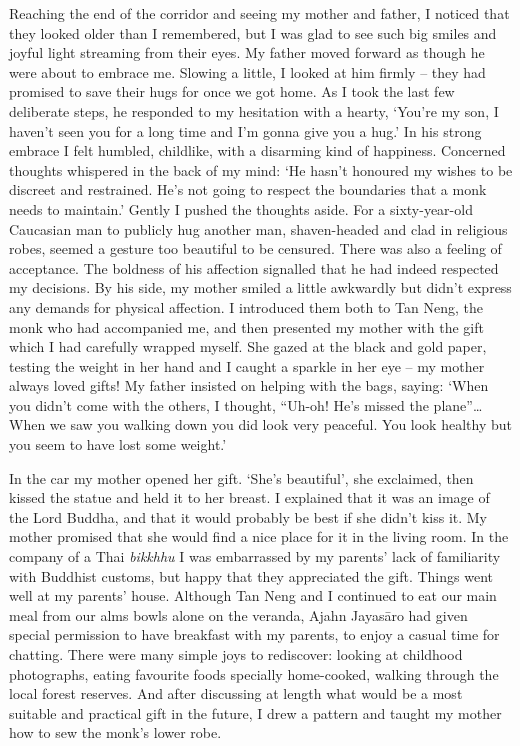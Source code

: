 Reaching the end of the corridor and seeing my mother and father, I
noticed that they looked older than I remembered, but I was glad to see
such big smiles and joyful light streaming from their eyes. My father
moved forward as though he were about to embrace me. Slowing a little, I
looked at him firmly -- they had promised to save their hugs for once
we got home. As I took the last few deliberate steps, he responded to my
hesitation with a hearty, `You're my son, I haven't seen you for a long
time and I'm gonna give you a hug.' In his strong embrace I felt
humbled, childlike, with a disarming kind of happiness. Concerned
thoughts whispered in the back of my mind: `He hasn't honoured my wishes
to be discreet and restrained. He's not going to respect the boundaries
that a monk needs to maintain.' Gently I pushed the thoughts aside. For
a sixty-year-old Caucasian man to publicly hug another man,
shaven-headed and clad in religious robes, seemed a gesture too
beautiful to be censured. There was also a feeling of acceptance. The
boldness of his affection signalled that he had indeed respected my
decisions. By his side, my mother smiled a little awkwardly but didn't
express any demands for physical affection. I introduced them both to
Tan Neng, the monk who had accompanied me, and then presented my mother
with the gift which I had carefully wrapped myself. She gazed at the
black and gold paper, testing the weight in her hand and I caught a
sparkle in her eye -- my mother always loved gifts! My father insisted
on helping with the bags, saying: `When you didn't come with the others,
I thought, ``Uh-oh! He's missed the plane''\ldots{} When we saw you
walking down you did look very peaceful. You look healthy but you seem
to have lost some weight.'

In the car my mother opened her gift. `She's beautiful', she exclaimed,
then kissed the statue and held it to her breast. I explained that it
was an image of the Lord Buddha, and that it would probably be best if
she didn't kiss it. My mother promised that she would find a nice place
for it in the living room. In the company of a Thai \emph{bikkhhu} I was
embarrassed by my parents' lack of familiarity with Buddhist customs,
but happy that they appreciated the gift. Things went well at my
parents' house. Although Tan Neng and I continued to eat our main meal
from our alms bowls alone on the veranda, Ajahn Jayasāro had given
special permission to have breakfast with my parents, to enjoy a casual
time for chatting. There were many simple joys to rediscover: looking at
childhood photographs, eating favourite foods specially home-cooked,
walking through the local forest reserves. And after discussing at
length what would be a most suitable and practical gift in the future, I
drew a pattern and taught my mother how to sew the monk's lower robe.

